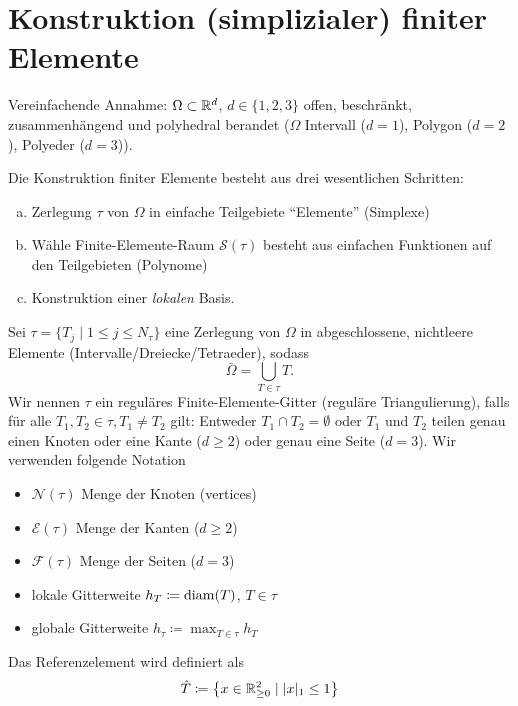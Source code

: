 \documentclass[../skript.tex]{subfiles}
\begin{document}
\section{Konstruktion (simplizialer) finiter Elemente} %
\label{sec:c2e3}
Vereinfachende Annahme: $\Omega \subset \mathbb{R}^d$, $d \in \{ 1, 2, 3 \}$ offen, beschränkt, zusammenhängend und polyhedral berandet ($\Omega$ Intervall ($d = 1$), Polygon ($d = 2$), Polyeder ($d = 3$)).

Die Konstruktion finiter Elemente besteht aus drei wesentlichen Schritten:
\begin{enumerate}[(a)]
\item Zerlegung $\tau$ von $\Omega$ in einfache Teilgebiete ``Elemente'' (Simplexe)
\item Wähle Finite-Elemente-Raum $\mathcal{S}(\tau)$ besteht aus einfachen Funktionen auf den Teilgebieten (Polynome)
\item Konstruktion einer \emph{lokalen} Basis.
\end{enumerate}
\begin{definition} %
\label{def:c2e3s1}
Sei $\tau = \{ T_j \mid 1 \leq j \leq N_\tau \}$ eine Zerlegung von $\Omega$ in abgeschlossene, nichtleere Elemente (Intervalle\slash{}Dreiecke\slash{}Tetraeder), sodass
\[
	\bar{\Omega} = \bigcup_{T \in \tau} T.
\]
Wir nennen $\tau$ ein reguläres Finite-Elemente-Gitter (reguläre Triangulierung), falls für alle $T_1, T_2 \in \tau, T_1 \ne T_2$ gilt:\tabularnewline
Entweder $T_1 \cap T_2 = \emptyset$ oder $T_1$ und $T_2$ teilen genau einen Knoten oder eine Kante ($d \geq 2$) oder genau eine Seite ($d = 3$).
Wir verwenden folgende Notation
\begin{itemize}
\item $\mathcal{N}(\tau)$ Menge der Knoten (vertices)
\item $\mathcal{E}(\tau)$ Menge der Kanten ($d \geq 2$)
\item $\mathcal{F}(\tau)$ Menge der Seiten ($d = 3$)
\item lokale Gitterweite $h_T \coloneqq \operatorname*{diam}(T)$, $T \in \tau$
\item globale Gitterweite $h_\tau \coloneqq \max_{T \in \tau} h_T$
\end{itemize}
\end{definition}
\begin{definition}[Referenzelement] %
\label{def:c2e3s2}
Das Referenzelement wird definiert als
\[
	\hat{T} \coloneqq \left\{ x \in \mathbb{R}_{\geq 0}^2 \mid |x|_1 \leq 1 \right\}
\]
\end{definition}
\end{document}
